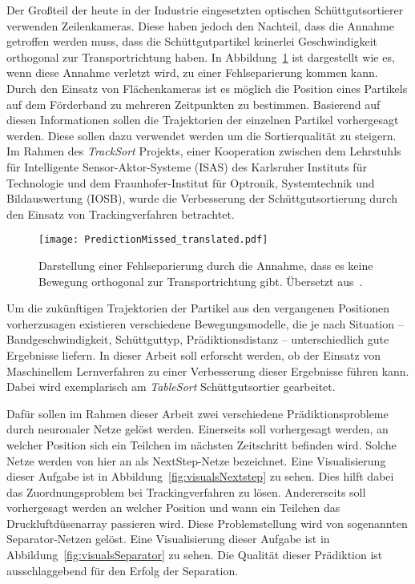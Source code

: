 
Der Großteil der heute in der Industrie eingesetzten optischen Schüttgutsortierer verwenden Zeilenkameras.
Diese haben jedoch den Nachteil, dass die Annahme getroffen werden muss, dass die Schüttgutpartikel keinerlei Geschwindigkeit orthogonal zur Transportrichtung haben.
In Abbildung~\ref{fig:predMissed} ist dargestellt wie es, wenn diese Annahme verletzt wird, zu einer Fehlseparierung kommen kann.
Durch den Einsatz von Flächenkameras ist es möglich die Position eines Partikels auf dem Förderband zu mehreren Zeitpunkten zu bestimmen.
Basierend auf diesen Informationen sollen die Trajektorien der einzelnen Partikel vorhergesagt werden.
Diese sollen dazu verwendet werden um die Sortierqualität zu steigern. 
Im Rahmen des \textit{TrackSort} Projekts, 
einer Kooperation zwischen dem Lehrstuhls für Intelligente Sensor-Aktor-Systeme (ISAS) des Karlsruher Instituts für Technologie
und dem Fraunhofer-Institut für Optronik, Systemtechnik und Bildauswertung (IOSB), 
wurde die Verbesserung der Schüttgutsortierung durch den Einsatz von Trackingverfahren betrachtet.

\begin{figure}[h]
    \centering
    \texttt{[image: PredictionMissed\_translated.pdf]}
    \caption{Darstellung einer Fehlseparierung durch die Annahme, dass es keine Bewegung orthogonal zur Transportrichtung gibt. 
    Übersetzt aus~\cite{Pfaff2018}.}
    \label{fig:predMissed}
\end{figure}


Um die zukünftigen Trajektorien der Partikel aus den vergangenen Positionen vorherzusagen existieren verschiedene Bewegungsmodelle, 
die je nach Situation -- Bandgeschwindigkeit, Schüttguttyp, Prädiktionsdistanz -- unterschiedlich gute Ergebnisse liefern.  
In dieser Arbeit soll erforscht werden, ob der Einsatz von Maschinellem Lernverfahren zu einer Verbesserung dieser Ergebnisse führen kann.
Dabei wird exemplarisch am \textit{TableSort} Schüttgutsortier gearbeitet.

Dafür sollen im Rahmen dieser Arbeit zwei verschiedene Prädiktionsprobleme durch neuronaler Netze gelöst werden.
Einerseits soll vorhergesagt werden, an welcher Position sich ein Teilchen im nächsten Zeitschritt befinden wird.
Solche Netze werden von hier an als NextStep-Netze bezeichnet.
Eine Visualisierung dieser Aufgabe ist in Abbildung~\ref{fig:visualsNextstep} zu sehen.
Dies hilft dabei das Zuordnungsproblem bei Trackingverfahren zu lösen.
Andererseits soll vorhergesagt werden an welcher Position und wann ein Teilchen das Druckluftdüsenarray passieren wird.
Diese Problemstellung wird von sogenannten Separator-Netzen gelöst.
Eine Visualisierung dieser Aufgabe ist in Abbildung~\ref{fig:visualsSeparator} zu sehen.
Die Qualität dieser Prädiktion ist ausschlaggebend für den Erfolg der Separation.


